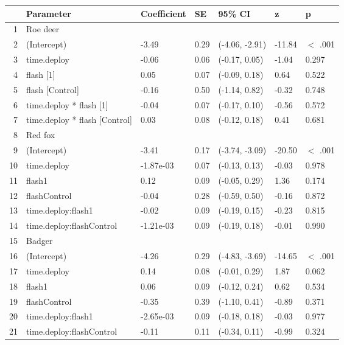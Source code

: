 \begin{table}[ht]
\centering
\begin{tabular}{rllllll}
  \hline
 & Parameter & Coefficient & SE & 95\% CI & z & p \\ 
  \hline
1 & Roe deer &  &  &  &  &        \\ 
  2 & (Intercept) & -3.49 & 0.29 & (-4.06, -2.91) & -11.84 & $<$ .001 \\ 
  3 & time.deploy & -0.06 & 0.06 & (-0.17,  0.05) & -1.04 & 0.297  \\ 
  4 & flash [1] & 0.05 & 0.07 & (-0.09,  0.18) & 0.64 & 0.522  \\ 
  5 & flash [Control] & -0.16 & 0.50 & (-1.14,  0.82) & -0.32 & 0.748  \\ 
  6 & time.deploy * flash [1] & -0.04 & 0.07 & (-0.17,  0.10) & -0.56 & 0.572  \\ 
  7 & time.deploy * flash [Control] & 0.03 & 0.08 & (-0.12,  0.18) & 0.41 & 0.681  \\ 
  8 & Red fox &  &  &  &  &        \\ 
  9 & (Intercept) & -3.41 & 0.17 & (-3.74, -3.09) & -20.50 & $<$ .001 \\ 
  10 & time.deploy & -1.87e-03 & 0.07 & (-0.13,  0.13) & -0.03 & 0.978  \\ 
  11 & flash1 & 0.12 & 0.09 & (-0.05,  0.29) & 1.36 & 0.174  \\ 
  12 & flashControl & -0.04 & 0.28 & (-0.59,  0.50) & -0.16 & 0.872  \\ 
  13 & time.deploy:flash1 & -0.02 & 0.09 & (-0.19,  0.15) & -0.23 & 0.815  \\ 
  14 & time.deploy:flashControl & -1.21e-03 & 0.09 & (-0.19,  0.18) & -0.01 & 0.990  \\ 
  15 & Badger &  &  &  &  &        \\ 
  16 & (Intercept) & -4.26 & 0.29 & (-4.83, -3.69) & -14.65 & $<$ .001 \\ 
  17 & time.deploy & 0.14 & 0.08 & (-0.01,  0.29) & 1.87 & 0.062  \\ 
  18 & flash1 & 0.06 & 0.09 & (-0.12,  0.24) & 0.62 & 0.534  \\ 
  19 & flashControl & -0.35 & 0.39 & (-1.10,  0.41) & -0.89 & 0.371  \\ 
  20 & time.deploy:flash1 & -2.65e-03 & 0.09 & (-0.18,  0.18) & -0.03 & 0.977  \\ 
  21 & time.deploy:flashControl & -0.11 & 0.11 & (-0.34,  0.11) & -0.99 & 0.324  \\ 

\end{tabular}
\end{table}
